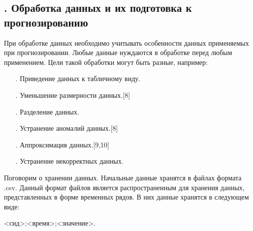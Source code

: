 \subtitlespace

\subsection*{ 
  \gostTitleFont
  \redline
  \thechaptercntr .\thesubchaptercntr \spc
  Обработка данных и их подготовка к прогнозированию
} \addtocounter{subchaptercntr}{1}

\subtitlespace

{\gostFont

  \par \redline При обработке данных необходимо учитывать особенности данных применяемых при прогнозировании. Любые данные нуждаются в обработке перед любым применением.  Цели такой обработки могут быть разные, например: 
  
  \begin{itemize}[leftmargin=2.15cm, labelwidth=0.65cm, labelsep=0.0cm] 
  	
  	\item[\theitemcntr. ] Приведение данных к табличному виду.
  	\addtocounter{itemcntr}{1}
  	
  	\item[\theitemcntr. ] Уменьшение размерности данных.[8]
  	\addtocounter{itemcntr}{1}
  	
  	\item[\theitemcntr. ] Разделение данных.
  	\addtocounter{itemcntr}{1}
  	
  	\item[\theitemcntr. ] Устранение аномалий данных.[8]
  	\addtocounter{itemcntr}{1}
  	
  	\item[\theitemcntr. ] Аппроксимация данных.[9,10]
  	\addtocounter{itemcntr}{1}
  	
  	\item[\theitemcntr. ] Устранение некорректных данных.
  	\addtocounter{itemcntr}{1}
  	
  	\setcounter{itemcntr}{1}
  \end{itemize}

  \par \redline Поговорим о хранении данных. Начальные данные хранятся в файлах формата .csv. Данный формат файлов является распространенным для хранения данных, представленных в форме временных рядов. В них данные хранятся в следующем виде: 
  
  \begin{Center}
  <сид>;<время>;<значение>. 
  \end{Center}

}
